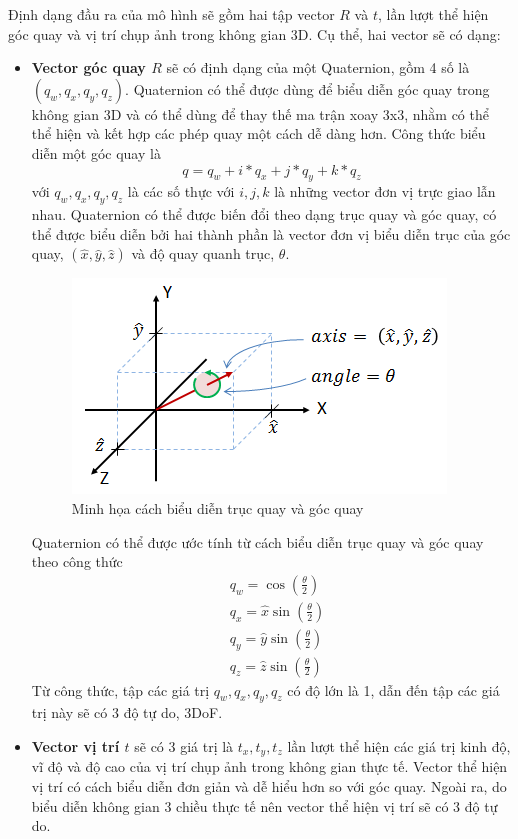 Định dạng đầu ra của mô hình sẽ gồm hai tập vector $R$ và $t$, lần lượt thể hiện góc quay và vị trí chụp ảnh trong không gian 3D. Cụ thể, hai vector sẽ có dạng:
\begin{itemize}
    \item \textbf{Vector góc quay $R$} sẽ có định dạng của một Quaternion, gồm 4 số là $(q_w,q_x,q_y,q_z)$. Quaternion có thể được dùng để biểu diễn góc quay trong không gian 3D và có thể dùng để thay thế ma trận xoay 3x3, nhằm có thể thể hiện và kết hợp các phép quay một cách dễ dàng hơn. Công thức biểu diễn một góc quay là 
    $$
    q=q_w + i*q_x + j*q_y + k*q_z
    $$
    với $q_w, q_x, q_y, q_z$ là các số thực với $i,j,k$ là những vector đơn vị trực giao lẫn nhau. Quaternion có thể được biến đổi theo dạng trục quay và góc quay, có thể được biểu diễn bởi hai thành phần là vector đơn vị biểu diễn trục của góc quay, $(\hat{x},\hat{y},\hat{z})$ và độ quay quanh trục, $\theta$. 
    \begin{figure}[H]
        \centering
        \includegraphics[scale=1]{pics/Proposal/axis-angle.png}
        \caption{Minh họa cách biểu diễn trục quay và góc quay \cite{quaternion}}
    \end{figure}
    Quaternion có thể được ước tính từ cách biểu diễn trục quay và góc quay theo công thức
    $$
    \begin{aligned}
        & q_w=\cos \left(\frac{\theta}{2}\right) \\
        & q_x=\hat{x} \sin \left(\frac{\theta}{2}\right) \\
        & q_y=\hat{y} \sin \left(\frac{\theta}{2}\right) \\
        & q_z=\hat{z} \sin \left(\frac{\theta}{2}\right)
    \end{aligned}
    $$
    Từ công thức, tập các giá trị $q_w, q_x, q_y, q_z$ có độ lớn là 1, dẫn đến tập các giá trị này sẽ có 3 độ tự do, 3DoF.
    \item \textbf{Vector vị trí $t$} sẽ có 3 giá trị là $t_x,t_y,t_z$ lần lượt thể hiện các giá trị kinh độ, vĩ độ và độ cao của vị trí chụp ảnh trong không gian thực tế. Vector thể hiện vị trí có cách biểu diễn đơn giản và dễ hiểu hơn so với góc quay. Ngoài ra, do biểu diễn không gian 3 chiều thực tế nên vector thể hiện vị trí sẽ có 3 độ tự do.
\end{itemize}

